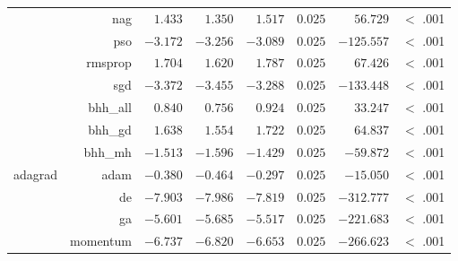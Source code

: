 \begin{table}[H]
{\begin{tabular}{lrrrrrrr}
			                     & nag                  & $1.433$              & $1.350$                                         & $1.517$              & $0.025$              & $56.729$             & $<$ .001    \\
			                     & pso                  & $-3.172$             & $-3.256$                                        & $-3.089$             & $0.025$              & $-125.557$           & $<$ .001    \\
			                     & rmsprop              & $1.704$              & $1.620$                                         & $1.787$              & $0.025$              & $67.426$             & $<$ .001    \\
			                     & sgd                  & $-3.372$             & $-3.455$                                        & $-3.288$             & $0.025$              & $-133.448$           & $<$ .001    \\
			                     & bhh\_all             & $0.840$              & $0.756$                                         & $0.924$              & $0.025$              & $33.247$             & $<$ .001    \\
			                     & bhh\_gd              & $1.638$              & $1.554$                                         & $1.722$              & $0.025$              & $64.837$             & $<$ .001    \\
			                     & bhh\_mh              & $-1.513$             & $-1.596$                                        & $-1.429$             & $0.025$              & $-59.872$            & $<$ .001    \\
			adagrad              & adam                 & $-0.380$             & $-0.464$                                        & $-0.297$             & $0.025$              & $-15.050$            & $<$ .001    \\
			$ $                  & de                   & $-7.903$             & $-7.986$                                        & $-7.819$             & $0.025$              & $-312.777$           & $<$ .001    \\
			                     & ga                   & $-5.601$             & $-5.685$                                        & $-5.517$             & $0.025$              & $-221.683$           & $<$ .001    \\
			                     & momentum             & $-6.737$             & $-6.820$                                        & $-6.653$             & $0.025$              & $-266.623$           & $<$ .001    \\

\end{tabular}}
\end{table}
